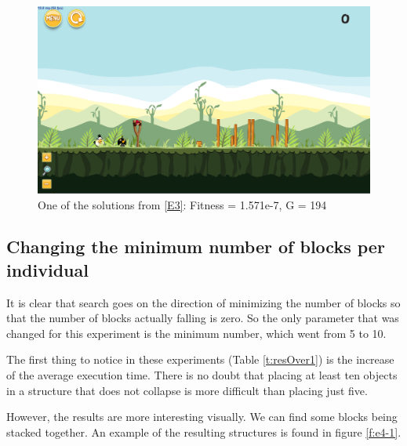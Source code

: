 \documentclass[sigconf]{acmart}
\begin{document}
\begin{figure}
	\centering
	\includegraphics[scale=0.2]{level-0-second_crossover180613_055622.png}
	\caption{One of the solutions from \ref{E3}: Fitness = 1.571e-7, G = 194  
	}\label{f:e3-4}
\end{figure}
\subsection{Changing the minimum number of blocks per individual}\label{E4}
It is clear that search goes on the direction
of minimizing the number of blocks so that the number of blocks
actually falling is zero.
So the only parameter that was changed for this experiment is the minimum
number, which went from 5 to 10. 

The first thing to notice in these experiments (Table \ref{t:resOver1}) is the 
increase of the average execution time.
There is no doubt 
that placing at least ten objects in a structure that does not
collapse is more difficult than placing just five.

However, the results are more interesting visually. We can find some blocks 
being stacked together.
An example of the resulting structures is found in figure \ref{f:e4-1}.
\end{document}
